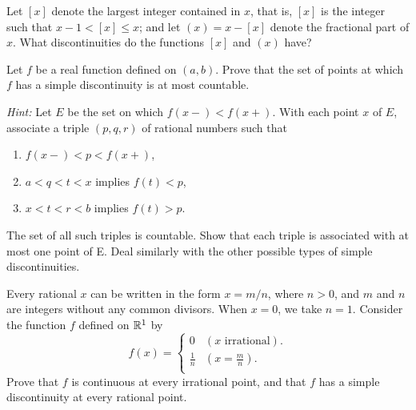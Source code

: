 \begin{myexercise}
    \label{ex:4.16}
    Let $[x]$ denote the largest integer contained in $x$, 
    that is, $[x]$ is the integer such that $x - 1 < [x] \leq x$; 
    and let $(x) = x - [x]$ denote the fractional part of $x$. 
    What discontinuities do the functions $[x]$ and $(x)$ have?
\end{myexercise}


\begin{myexercise}
    \label{ex:4.17}
    Let $f$ be a real function defined on $(a, b)$. 
    Prove that the set of points at which $f$ has a simple discontinuity is at most countable. 
    
    \emph{Hint:} Let $E$ be the set on which $f(x-) <f(x+ )$. 
    With each point $x$ of $E$, associate a triple $(p, q, r)$ of rational numbers such that 
    \begin{enumerate}
        \item $f(x-) < p <f(x+ )$,
        \item $a < q < t < x$ implies $f(t) < p$,
        \item $x < t < r < b$ implies $f(t) > p$.
    \end{enumerate} 
    The set of all such triples is countable. 
    Show that each triple is associated with at most one point of E. Deal similarly with the other possible types of simple discontinuities.
\end{myexercise}


\begin{myexercise}
    \label{ex:4.18}
    Every rational $x$ can be written in the form $x = m/n$, 
    where $n > 0$, and $m$ and $n$ are integers without any common divisors. 
    When $x = 0$, we take $n = 1$. 
    Consider the function $f$ defined on ${\protect\mathbb R}^1$ by 
    \begin{equation*}
        f(x) = \left\{ 
            \begin{array}{ll}
                0 & (x \text{ irrational}). \\
                \frac{1}{n} & \left( x = \frac{m}{n} \right) .\\
            \end{array}
        \right.
    \end{equation*} 
    Prove that $f$ is continuous at every irrational point, 
    and that $f$ has a simple discontinuity at every rational point.
\end{myexercise}


